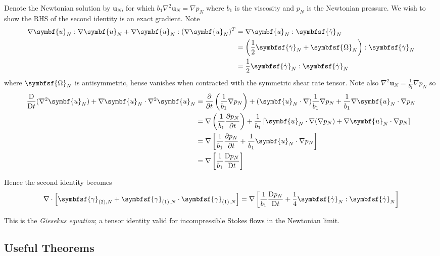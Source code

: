 \documentclass{jknotes}
\newcommand{\Nsrate}[1]{\symbfsf{\gamma}_{(#1),N}}
\begin{document}
Denote the Newtonian solution by $\symbf{u}_N$, for which $b_1 \nabla^2
\symbf{u}_N = \nabla p_N$ where $b_1$ is the viscosity and $p_N$ is the
Newtonian pressure. We wish to show the RHS of the second identity is an exact
gradient. Note
\begin{align}
	\nabla \symbf{u}_N : \nabla \symbf{u}_N + \nabla \symbf{u}_N : (\nabla
	\symbf{u}_N)^T &= \nabla \symbf{u}_N:\symbfsf{\srate}_N \\
				   &= \left(\frac{1}{2} \symbfsf{\srate}_N +
				\symbfsf{\Omega}_N \right):\symbfsf{\srate}_N \\
				&= \frac{1}{2} \symbfsf{\srate}_N:\symbfsf{\srate}_N
\end{align}
where $\symbfsf{\Omega}_N$ is antisymmetric, hense vanishes when contracted
with the symmetric shear rate tensor.
Note also $\nabla^2 \symbf{u}_N = \frac{1}{b_1} \nabla p_N$ so
\begin{align}
	\frac{\diffD}{\diffD t} (\nabla^2 \symbf{u}_N) + \nabla \symbf{u}_N \cdot
	\nabla^2 \symbf{u}_N &= \frac{\partial}{\partial
		t}\left(\frac{1}{b_1}\nabla p_N\right) +
		(\symbf{u}_N\cdot\nabla)\frac{1}{b_1}\nabla p_N + \inv{b_1} \nabla
		\symbf{u}_N \cdot \nabla p_N \\
		&= \nabla \left( \inv{b_1} \frac{\partial p_N}{\partial t} \right) +
		\inv{b_1} \left[ \symbf{u}_N \cdot \nabla(\nabla p_N) + \nabla
		\symbf{u}_N \cdot \nabla p_N\right] \\
		&= \nabla \left[ \inv{b_1} \frac{\partial p_N}{\partial t} + \inv{b_1}
	\symbf{u}_N\cdot\nabla p_N\right] \\
	&= \nabla \left[ \inv{b_1} \frac{\diffD p_N}{\diffD t}\right]
\end{align}

Hence the second identity becomes
\begin{equation}
	\nabla \cdot \left[ \Nsrate{2} + \Nsrate{1} \cdot \Nsrate{1}\right] =
	\nabla \left[ \inv{b_1} \frac{\diffD p_N}{\diffD t} + \frac{1}{4}
	\symbfsf{\srate}_N:\symbfsf{\srate}_N\right]
\end{equation}

This is the \emph{Giesekus equation}; a tensor identity valid for
incompressible Stokes flows in the Newtonian limit.

\subsection{Useful Theorems}
\end{document}
